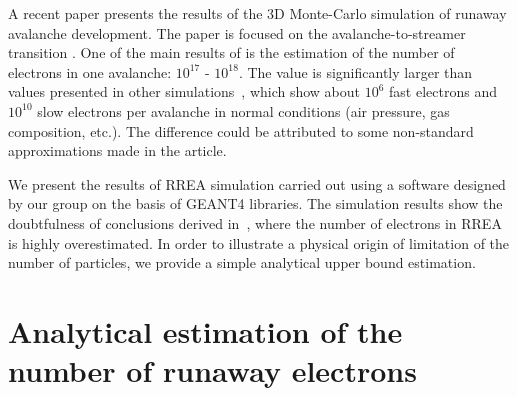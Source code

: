 \documentclass[doublecol,linenumbers]{epl2} %
\begin{document}
    A recent paper \cite{Oreshkin_2018} presents the results of the 3D Monte-Carlo simulation of runaway avalanche development. The paper is focused on the avalanche-to-streamer transition . One of the main results of \cite{Oreshkin_2018} is the estimation of the number of electrons in one avalanche: $10^{17}$ - $10^{18}$. The value is significantly larger than values presented in other simulations~\cite{Gurevich:2001, dwyer2003fundamental,dwyer2011low}, which show about $10^6$ fast electrons and $10^{10}$ slow electrons per avalanche in normal conditions (air pressure, gas composition, etc.). The difference could be attributed to some non-standard approximations made in the article.
    
    We present the results of RREA simulation carried out using a software designed by our group on the basis of GEANT4 libraries. The simulation results show the doubtfulness of conclusions derived in~\cite{Oreshkin_2018}, where the number of electrons in RREA is highly overestimated. In order to illustrate a physical origin of limitation of the number of particles, we provide a simple analytical upper bound estimation.
    
    \section{Analytical estimation of the number of runaway electrons}
    
\end{document}

